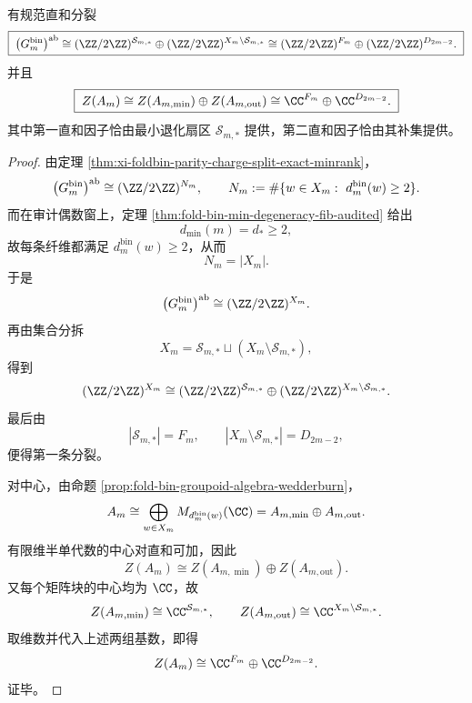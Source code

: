 \begin{theorem}\label{thm:xi-audited-even-abel-center-fibonacci-splitting}
有规范直和分裂
\[
\boxed{\;
\bigl(G_m^{\mathrm{bin}}\bigr)^{\mathrm{ab}}
\cong
(\ZZ/2\ZZ)^{\mathcal S_{m,*}}
\oplus
(\ZZ/2\ZZ)^{X_m\setminus\mathcal S_{m,*}}
\cong
(\ZZ/2\ZZ)^{F_m}\oplus(\ZZ/2\ZZ)^{D_{2m-2}}.\;}
\]
并且
\[
\boxed{\;
Z(A_m)
\cong
Z(A_{m,\min})\oplus Z(A_{m,\mathrm{out}})
\cong
\CC^{F_m}\oplus\CC^{D_{2m-2}}.\;}
\]
其中第一直和因子恰由最小退化扇区 \(\mathcal S_{m,*}\) 提供，第二直和因子恰由其补集提供。
\end{theorem}
\begin{proof}
由定理 \ref{thm:xi-foldbin-parity-charge-split-exact-minrank}，
\[
\bigl(G_m^{\mathrm{bin}}\bigr)^{\mathrm{ab}}
\cong
(\ZZ/2\ZZ)^{N_m},
\qquad
N_m:=\#\{w\in X_m:\ d_m^{\mathrm{bin}}(w)\ge 2\}.
\]
而在审计偶数窗上，定理 \ref{thm:fold-bin-min-degeneracy-fib-audited} 给出
\[
d_{\min}(m)=d_*\ge 2,
\]
故每条纤维都满足 \(d_m^{\mathrm{bin}}(w)\ge 2\)，从而
\[
N_m=|X_m|.
\]
于是
\[
\bigl(G_m^{\mathrm{bin}}\bigr)^{\mathrm{ab}}
\cong
(\ZZ/2\ZZ)^{X_m}.
\]
再由集合分拆
\[
X_m=\mathcal S_{m,*}\sqcup(X_m\setminus\mathcal S_{m,*}),
\]
得到
\[
(\ZZ/2\ZZ)^{X_m}
\cong
(\ZZ/2\ZZ)^{\mathcal S_{m,*}}
\oplus
(\ZZ/2\ZZ)^{X_m\setminus\mathcal S_{m,*}}.
\]
最后由
\[
|\mathcal S_{m,*}|=F_m,
\qquad
|X_m\setminus\mathcal S_{m,*}|=D_{2m-2},
\]
便得第一条分裂。

对中心，由命题 \ref{prop:fold-bin-groupoid-algebra-wedderburn}，
\[
A_m
\cong
\bigoplus_{w\in X_m}M_{d_m^{\mathrm{bin}}(w)}(\CC)
=
A_{m,\min}\oplus A_{m,\mathrm{out}}.
\]
有限维半单代数的中心对直和可加，因此
\[
Z(A_m)\cong Z(A_{m,\min})\oplus Z(A_{m,\mathrm{out}}).
\]
又每个矩阵块的中心均为 \(\CC\)，故
\[
Z(A_{m,\min})\cong \CC^{\mathcal S_{m,*}},
\qquad
Z(A_{m,\mathrm{out}})\cong \CC^{X_m\setminus\mathcal S_{m,*}}.
\]
取维数并代入上述两组基数，即得
\[
Z(A_m)\cong \CC^{F_m}\oplus \CC^{D_{2m-2}}.
\]
证毕。
\end{proof}

